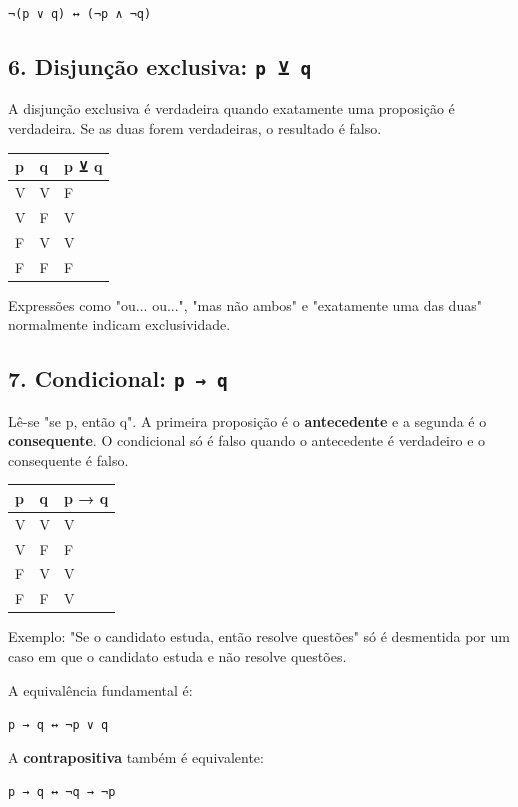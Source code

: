 \documentclass[11pt,a4paper]{article}
\begin{document}
\texttt{¬(p ∨ q) ↔ (¬p ∧ ¬q)}

\subsection*{6. Disjunção exclusiva: \texttt{p ⊻ q}}

A disjunção exclusiva é verdadeira quando exatamente uma proposição é verdadeira. Se as duas forem verdadeiras, o resultado é falso.

\begin{tabularx}{\linewidth}{llX}
\toprule
 \textbf{p} & \textbf{q} & \textbf{p ⊻ q} \\
\midrule
 V & V & F \\
 V & F & V \\
 F & V & V \\
 F & F & F \\
\bottomrule
\end{tabularx}


Expressões como "ou... ou...", "mas não ambos" e "exatamente uma das duas" normalmente indicam exclusividade.

\subsection*{7. Condicional: \texttt{p → q}}

Lê-se "se p, então q". A primeira proposição é o \textbf{antecedente} e a segunda é o \textbf{consequente}. O condicional só é falso quando o antecedente é verdadeiro e o consequente é falso.

\begin{tabularx}{\linewidth}{llX}
\toprule
 \textbf{p} & \textbf{q} & \textbf{p → q} \\
\midrule
 V & V & V \\
 V & F & F \\
 F & V & V \\
 F & F & V \\
\bottomrule
\end{tabularx}


Exemplo: "Se o candidato estuda, então resolve questões" só é desmentida por um caso em que o candidato estuda e não resolve questões.

A equivalência fundamental é:

\texttt{p → q ↔ ¬p ∨ q}

A \textbf{contrapositiva} também é equivalente:

\texttt{p → q ↔ ¬q → ¬p}
\end{document}
